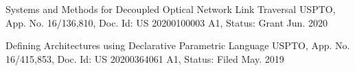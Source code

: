 
\begin{cventries}
  \pubentry
    {Systems and Methods for Decoupled Optical Network Link Traversal}
    {USPTO, App. No. 16/136,810, Doc. Id: US 20200100003 A1, Status: Grant}
    {Jun. 2020} %

  \pubentry
    {Defining Architectures using Declarative Parametric Language}
    {USPTO, App. No. 16/415,853, Doc. Id: US 20200364061 A1, Status: Filed}
    {May. 2019} %

\end{cventries}

